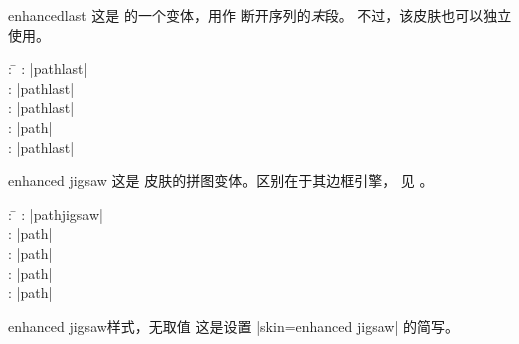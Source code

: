 \begin{dispExample}
\end{dispExample}


\clearpage
\begin{docSkin}{enhancedlast}
这是  的一个变体，用作  断开序列的\emph{末}段。
不过，该皮肤也可以独立使用。
\begin{tcolorbox}[skintable=enhancedlast]
  \begin{tabbing}
    : \=\kill
    :           \> |pathlast|\\
    : \> |pathlast|\\ 
    :        \> |pathlast|\\
    :    \> |path|\\
    :           \> |pathlast|
  \end{tabbing}
\end{tcolorbox}
\end{docSkin}

\begin{dispExample}
\end{dispExample}

\clearpage

\begin{docSkin}{enhanced jigsaw}
  这是  皮肤的拼图变体。区别在于其边框引擎，
  见 。
\begin{tcolorbox}[skintable=enhanced jigsaw]
  \begin{tabbing}
    : \=\kill
    :           \> |pathjigsaw|\\
    : \> |path|\\ 
    :        \> |path|\\
    :    \> |path|\\
    :           \> |path|
  \end{tabbing}
\end{tcolorbox}
\end{docSkin}

\begin{docTcbKey}{enhanced jigsaw}{}{样式，无取值}
  这是设置 |skin=enhanced jigsaw| 的简写。
\end{docTcbKey}


